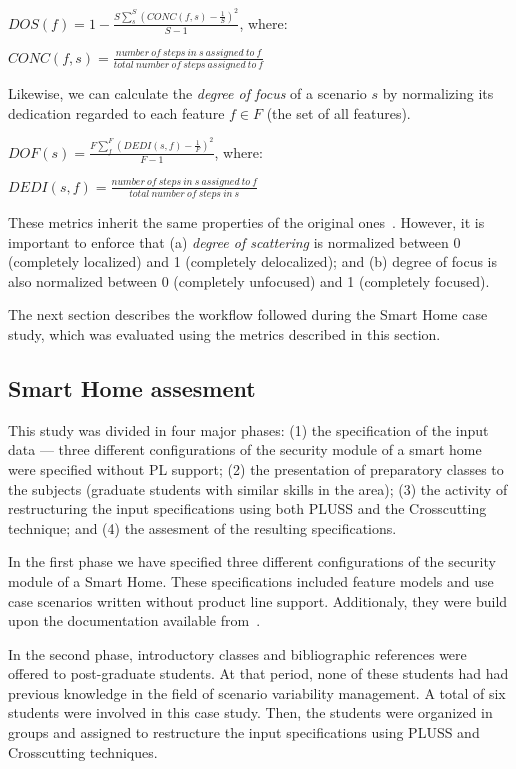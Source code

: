 \documentclass{acm_proc_article-sp}
\begin{document}
\begin{center}
$DOS(f) = 1 - \frac{S \sum_{s}^{S}(CONC(f,s)-\frac{1}{S})^2}{S-1}$, where:

$CONC(f,s) = \frac{number\ of\ steps\ in\ s\ assigned\ to\ f}{total\ number\
of\ steps\ assigned\ to\ f}$
\end{center}

Likewise, we can calculate the \emph{degree of focus} of a scenario $s$ by
normalizing its dedication regarded to each feature $f \in F$ (the set of
all features). 

\begin{center}
$DOF(s) = \frac{F \sum_{f}^{F}(DEDI(s,f)-\frac{1}{F})^2}{F-1}$, where:

$DEDI(s,f) = \frac{number\ of\ steps\ in\ s\ assigned\ to\ f}{total\ number\
of\ steps\ in\ s}$
\end{center}

These metrics inherit the same properties of the original
ones~\cite{Eaddy:2007aa}. However, it is important to enforce that (a)
\emph{degree of scattering} is normalized between 0 (completely localized) and 1 (completely
delocalized); and (b) degree of focus is also normalized between 0 (completely
unfocused) and 1 (completely focused). 

The next section describes the workflow followed during the Smart Home
case study, which was evaluated using the metrics described in this section.

\subsection{Smart Home assesment}

This study was divided in four major phases: (1) the specification of the input
data --- three different configurations of the security module of a smart home
were specified without PL support; (2) the presentation of preparatory classes to the subjects
(graduate students with similar skills in the area); (3) the activity of
restructuring the input specifications using both PLUSS and the Crosscutting
technique; and (4) the assesment of the resulting specifications.

In the first phase we have specified three different configurations of the
security module of a Smart Home. These specifications included feature models and
use case scenarios written without product line support. Additionaly, they were
build upon the documentation available from~\cite{Pohl:2005aa,AMPLE}.

In the second phase, introductory classes and bibliographic references were
offered to post-graduate students. At that period, none of these students had
had previous knowledge in the field of scenario variability management. A total of six
students were involved in this case study. Then, the students were organized in
groups and assigned to restructure the input specifications using PLUSS and
Crosscutting techniques. 
\end{document}
